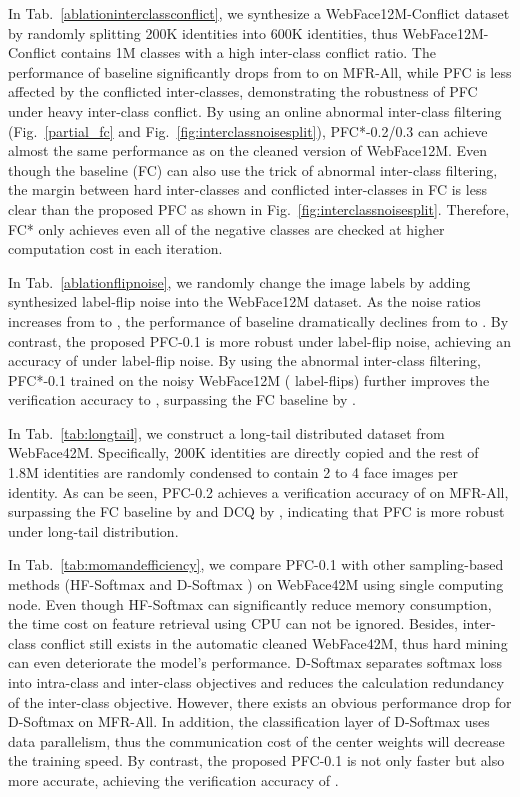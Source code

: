 \documentclass[10pt,twocolumn,letterpaper]{article}
\begin{document}
In Tab.~\ref{ablationinterclassconflict}, we synthesize a WebFace12M-Conflict dataset by randomly splitting 200K identities into 600K identities, thus WebFace12M-Conflict contains 1M classes with a high inter-class conflict ratio. The performance of baseline significantly drops from  to  on MFR-All, while PFC is less affected by the conflicted inter-classes, demonstrating the robustness of PFC under heavy inter-class conflict.
By using an online abnormal inter-class filtering (Fig.~\ref{partial_fc} and Fig.~\ref{fig:interclassnoisesplit}), PFC*-0.2/0.3 can achieve almost the same performance as on the cleaned version of WebFace12M. Even though the baseline (FC) can also use the trick of abnormal inter-class filtering, the margin between hard inter-classes and conflicted inter-classes in FC is less clear than the proposed PFC as shown in Fig.~\ref{fig:interclassnoisesplit}. Therefore, FC* only achieves  even all of the negative classes are checked at higher computation cost in each iteration.

In Tab.~\ref{ablationflipnoise}, we randomly change the image labels by adding synthesized label-flip noise into the WebFace12M dataset.
As the noise ratios increases from  to , the performance of baseline dramatically declines from  to . By contrast, the proposed PFC-0.1 is more robust under label-flip noise, achieving an accuracy of  under  label-flip noise. By using the abnormal inter-class filtering, PFC*-0.1 trained on the noisy WebFace12M ( label-flips) further improves the verification accuracy to , surpassing the FC baseline by . 

In Tab.~\ref{tab:longtail}, we construct a long-tail distributed dataset from WebFace42M. Specifically, 200K identities are directly copied and the rest of 1.8M identities are randomly condensed to contain 2 to 4 face images per identity. As can be seen, PFC-0.2 achieves a verification accuracy of  on MFR-All, surpassing the FC baseline by  and DCQ by , indicating that PFC is more robust under long-tail distribution. 

In Tab.~\ref{tab:momandefficiency}, we compare PFC-0.1 with other sampling-based methods (\eg HF-Softmax \cite{zhang2018accelerated} and D-Softmax \cite{he2020softmax}) on WebFace42M using single computing node. Even though HF-Softmax can significantly reduce memory consumption, the time cost on feature retrieval using CPU can not be ignored. Besides, inter-class conflict still exists in the automatic cleaned WebFace42M, thus hard mining can even deteriorate the model's performance. D-Softmax separates softmax loss into intra-class and inter-class objectives and reduces the calculation redundancy of the inter-class objective. However, there exists an obvious performance drop for D-Softmax on MFR-All. In addition, the classification layer of D-Softmax uses data parallelism, thus the communication cost of the center weights will decrease the training speed. By contrast, the proposed PFC-0.1 is not only faster but also more accurate, achieving the verification accuracy of .
\end{document}
